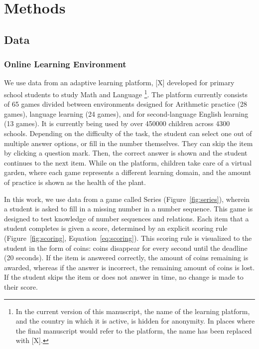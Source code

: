 \documentclass[11pt]{article}
\begin{document}
\section{Methods}
\subsection{Data}
\subsubsection{Online Learning Environment}
We use data from an adaptive learning platform, [X] developed for primary school students to study Math and Language \footnote{In the current version of this manuscript, the name of the learning platform, and the country in which it is active, is hidden for anonymity. In places where the final manuscript would refer to the platform, the name has been replaced with [X].}. The platform currently consists of 65 games divided between environments designed for Arithmetic practice (28 games), language learning (24 games), and for second-language English learning (13 games). It is currently being used by over \num{450000} children across \num{4300} schools. Depending on the difficulty of the task, the student can select one out of multiple answer options, or fill in the number themselves. They can skip the item by clicking a question mark. Then, the correct answer is shown and the student continues to the next item. While on the platform, children take care of a virtual garden, where each game represents a different learning domain, and the amount of practice is shown as the health of the plant. 

In this work, we use data from a game called Series (Figure~\ref{fig:series}), wherein a student is asked to fill in a missing number in a number sequence. This game is designed to test knowledge of number sequences and relations. Each item that a student completes is given a score, determined by an explicit scoring rule (Figure~\ref{fig:scoring}, Equation~\ref{eq:scoring}). This scoring rule is visualized to the student in the form of coins: coins disappear for every second until the deadline (20 seconds). If the item is answered correctly, the amount of coins remaining is awarded, whereas if the answer is incorrect, the remaining amount of coins is lost. If the student skips the item or does not answer in time, no change is made to their score. 
\end{document}
